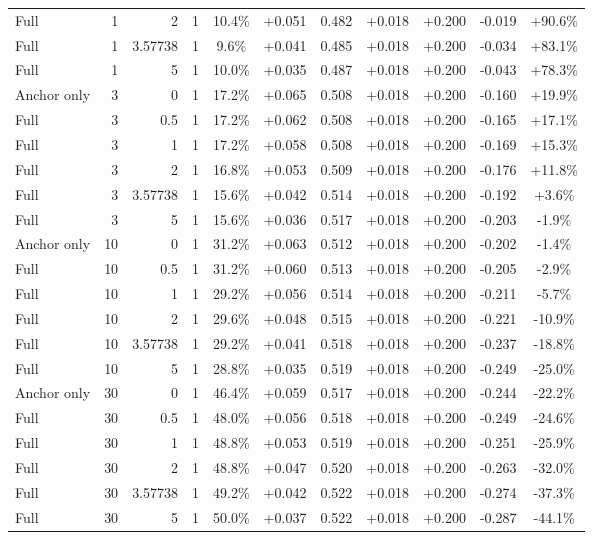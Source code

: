 \begin{table}[htbp]
\begin{tabular}{lrrrccccccc}
Full & 1 & 2 & 1 & 10.4\% & +0.051 & 0.482 & +0.018 & +0.200 & -0.019 & +90.6\% \\
Full & 1 & 3.57738 & 1 & 9.6\% & +0.041 & 0.485 & +0.018 & +0.200 & -0.034 & +83.1\% \\
Full & 1 & 5 & 1 & 10.0\% & +0.035 & 0.487 & +0.018 & +0.200 & -0.043 & +78.3\% \\
Anchor only & 3 & 0 & 1 & 17.2\% & +0.065 & 0.508 & +0.018 & +0.200 & -0.160 & +19.9\% \\
Full & 3 & 0.5 & 1 & 17.2\% & +0.062 & 0.508 & +0.018 & +0.200 & -0.165 & +17.1\% \\
Full & 3 & 1 & 1 & 17.2\% & +0.058 & 0.508 & +0.018 & +0.200 & -0.169 & +15.3\% \\
Full & 3 & 2 & 1 & 16.8\% & +0.053 & 0.509 & +0.018 & +0.200 & -0.176 & +11.8\% \\
Full & 3 & 3.57738 & 1 & 15.6\% & +0.042 & 0.514 & +0.018 & +0.200 & -0.192 & +3.6\% \\
Full & 3 & 5 & 1 & 15.6\% & +0.036 & 0.517 & +0.018 & +0.200 & -0.203 & -1.9\% \\
Anchor only & 10 & 0 & 1 & 31.2\% & +0.063 & 0.512 & +0.018 & +0.200 & -0.202 & -1.4\% \\
Full & 10 & 0.5 & 1 & 31.2\% & +0.060 & 0.513 & +0.018 & +0.200 & -0.205 & -2.9\% \\
Full & 10 & 1 & 1 & 29.2\% & +0.056 & 0.514 & +0.018 & +0.200 & -0.211 & -5.7\% \\
Full & 10 & 2 & 1 & 29.6\% & +0.048 & 0.515 & +0.018 & +0.200 & -0.221 & -10.9\% \\
Full & 10 & 3.57738 & 1 & 29.2\% & +0.041 & 0.518 & +0.018 & +0.200 & -0.237 & -18.8\% \\
Full & 10 & 5 & 1 & 28.8\% & +0.035 & 0.519 & +0.018 & +0.200 & -0.249 & -25.0\% \\
Anchor only & 30 & 0 & 1 & 46.4\% & +0.059 & 0.517 & +0.018 & +0.200 & -0.244 & -22.2\% \\
Full & 30 & 0.5 & 1 & 48.0\% & +0.056 & 0.518 & +0.018 & +0.200 & -0.249 & -24.6\% \\
Full & 30 & 1 & 1 & 48.8\% & +0.053 & 0.519 & +0.018 & +0.200 & -0.251 & -25.9\% \\
Full & 30 & 2 & 1 & 48.8\% & +0.047 & 0.520 & +0.018 & +0.200 & -0.263 & -32.0\% \\
Full & 30 & 3.57738 & 1 & 49.2\% & +0.042 & 0.522 & +0.018 & +0.200 & -0.274 & -37.3\% \\
Full & 30 & 5 & 1 & 50.0\% & +0.037 & 0.522 & +0.018 & +0.200 & -0.287 & -44.1\% \\

\end{tabular}
\end{table}
